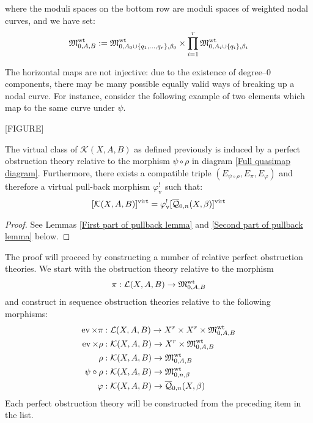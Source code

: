 where the moduli spaces on the bottom row are moduli spaces of weighted nodal curves, and we have set:
\begin{equation*} \mathfrak M_{0,A,B}^{\operatorname{wt}} := \mathfrak M_{0,A_0\cup\{q_1,\ldots,q_r\},\beta_0}^{\operatorname{wt}} \times \prod_{i=1}^r \mathfrak M_{0,A_i\cup\{q_i\},\beta_i}^{\operatorname{wt}} \end{equation*}

\begin{remark} The horizontal maps are not injective: due to the existence of degree--$0$ components, there may be many possible equally valid ways of breaking up a nodal curve. For instance, consider the following example of two elements which map to the same curve under $\psi$.

[FIGURE]
\end{remark}

\begin{lemma} \label{Lemma product class equals pullback class} The virtual class of $\mathcal{K}(X,A,B)$ as defined previously is induced by a perfect obstruction theory relative to the morphism $\psi \circ \rho$ in diagram \eqref{Full quasimap diagram}. Furthermore, there exists a compatible triple $(E_{\psi \circ \rho}, E_{\pi}, E_{\varphi})$ and therefore a virtual pull-back morphism $\varphi_{\text{v}}^!$ such that:
\begin{equation*} [\mathcal{K}(X,A,B)]^{\operatorname{virt}} = \varphi_{\text{v}}^! [\overline{\mathcal Q}_{0,n}(X,\beta)]^{\operatorname{virt}} \end{equation*} \end{lemma}
\begin{proof} See Lemmas \ref{First part of pullback lemma} and \ref{Second part of pullback lemma} below. \end{proof}

The proof will proceed by constructing a number of relative perfect obstruction theories. We start with the obstruction theory relative to the morphism
\begin{equation*} \pi : \mathcal{L}(X,A,B) \rightarrow \mathfrak M_{0,A,B}^{\operatorname{wt}} \end{equation*}
and construct in sequence obstruction theories relative to the following morphisms:
\begin{align*}
\operatorname{ev} \times \pi & : \mathcal{L}(X,A,B) \rightarrow X^r \times X^r \times \mathfrak M_{0,A,B}^{\operatorname{wt}}\\
\operatorname{ev} \times \rho & : \mathcal{K}(X,A,B) \rightarrow X^r \times \mathfrak M_{0,A,B}^{\operatorname{wt}} \\
\rho & : \mathcal{K}(X,A,B) \rightarrow \mathfrak M_{0,A,B}^{\operatorname{wt}}\\
\psi \circ \rho & : \mathcal{K}(X,A,B) \rightarrow \mathfrak M_{0,n,\beta}^{\operatorname{wt}} \\
\varphi & : \mathcal{K}(X,A,B) \rightarrow \overline{\mathcal Q}_{0,n}(X,\beta)
\end{align*}
Each perfect obstruction theory will be constructed from the preceding item in the list.

